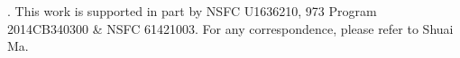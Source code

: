 .
This work is supported in part by NSFC {\small U1636210}, 973 Program {\small 2014CB340300} \& NSFC {\small 61421003}. For any correspondence, please refer to Shuai Ma.

